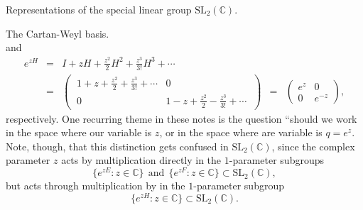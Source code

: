 \documentclass[letterpaper,11pt, reqno]{amsart}
\newtheorem{monodromy theorem}{Monodromy Theorem}[subsection]
\newtheorem{wild conjecture}[theorem]{Wild Conjecture}
\newtheorem{research objectives}{Research objectives}[subsection]
\newtheorem{research question}[theorem]{Research questions}
\newtheorem{aside question}[theorem]{Aside question}
\newtheorem{audio example}[theorem]{\loudspeaker[3] Example}
\newtheorem{blank remark}[theorem]{}
\newtheorem{terminology and comment}[theorem]{Terminology and comment}
\newtheorem{purity hypothesis}[theorem]{Purity hypothesis}
\newtheorem{corollary of the purity hypothesis}[theorem]{Corollary of the purity hypothesis}
\newcommand{\CC} {{\mathbb C}}
\numberwithin{equation}{theorem}
\begin{document}
\begin{section}{Representations of the special linear group $\text{SL}_{2}(\CC)$.}
\begin{subsection}{The Cartan-Weyl basis.}
$$	$$
and
	$$
	\begin{array}{rclcl}
	e^{zH}
	& \!\!=\!\! &
	I+zH+\frac{z^2}{2}H^2+\frac{z^3}{3!}H^3+\cdots
	\\[20pt]
	& \!\!=\!\! &
	\left(\ \!\begin{array}{cc} 1+z+\tfrac{z^2}{2}+\tfrac{z^3}{3!}+\cdots & 0 \\[7pt] 0 & 1-z+\tfrac{z^2}{2}-\tfrac{z^3}{3!}+\cdots\end{array}\!\ \right)
	& \!\!=\!\! &
	\left(\!\begin{array}{cc} e^z & 0 \\ 0 & e^{-z}\end{array}\!\right),
	\end{array}
	$$
respectively. One recurring theme in these notes is the question ``should we work in the space where our variable is $z$, or in the space where are variable is $q=e^{z}$. Note, though, that this distinction gets confused in $\text{SL}_{2}(\CC)$, since the complex parameter $z$ acts by multiplication directly in the $1$-parameter subgroups $$\{e^{zE}:z\in\CC\}\ \ \text{and}\ \ \{e^{zF}:z\in\CC\}\subset\text{SL}_{2}(\CC),$$ but acts through multiplication by in the $1$-parameter subgroup $$\{e^{zH}:z\in\CC\}\subset\text{SL}_{2}(\CC).$$


\end{subsection}
\end{section}
\end{document}
